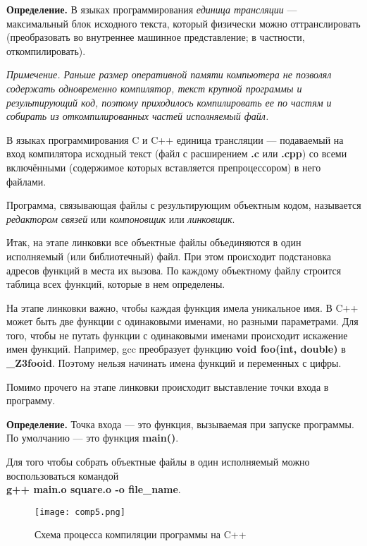 \documentclass[12pt]{article}
\begin{document}
\textbf{Определение.} В языках программирования \textit{единица трансляции} --- максимальный блок исходного текста, который физически можно оттранслировать (преобразовать во внутреннее машинное представление; в частности, откомпилировать). 

\textit{Примечение. Раньше размер оперативной памяти компьютера не позволял содержать одновременно компилятор, текст крупной программы и результирующий код, поэтому приходилось компилировать ее по частям и собирать из откомпилированных частей исполняемый файл.}

В языках программирования C и C++ единица трансляции --- подаваемый на вход компилятора исходный текст (файл с расширением \textbf{.c} или \textbf{.cpp}) со всеми включёнными (содержимое которых вставляется препроцессором) в него файлами.

Программа, связывающая файлы с результирующим объектным кодом, называется \textit{редактором связей} или \textit{компоновщик} или \textit{линковщик}.


Итак, на этапе линковки все объектные файлы объединяются в один исполняемый (или библиотечный) файл. При этом происходит подстановка адресов функций в места их вызова. По каждому объектному файлу строится таблица всех функций, которые в нем определены. 


На этапе линковки важно, чтобы каждая функция имела уникальное имя. В C++ может быть две функции с одинаковыми именами, но разными параметрами. Для того, чтобы не путать функции с одинаковыми именами происходит искажение имен функций. Например, gcc преобразует функцию
\textbf{void foo(int, double)} в \textbf{\_Z3fooid}. Поэтому нельзя начинать имена функций и переменных с цифры.

Помимо прочего на этапе линковки происходит выставление точки входа в программу.

\textbf{Определение.} Точка входа --- это функция, вызываемая при запуске программы. По умолчанию --- это функция \textbf{main()}. 


Для того чтобы собрать объектные файлы в один исполняемый можно воспользоваться командой \\
\textbf{g++ main.o square.o -o file\_name}.


\begin{figure}[h]
\centering
\texttt{[image: comp5.png]}
\caption{Схема процесса компиляции программы на C++}
\label{fig:mpr}
\end{figure} 
\end{document}
